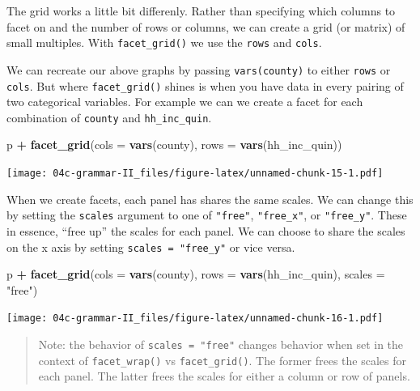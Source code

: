 \documentclass[
]{book}
\newenvironment{Shaded}{\begin{snugshade}}{\end{snugshade}}
\newcommand{\DataTypeTok}[1]{\textcolor[rgb]{0.13,0.29,0.53}{#1}}
\newcommand{\KeywordTok}[1]{\textcolor[rgb]{0.13,0.29,0.53}{\textbf{#1}}}
\newcommand{\NormalTok}[1]{#1}
\newcommand{\OperatorTok}[1]{\textcolor[rgb]{0.81,0.36,0.00}{\textbf{#1}}}
\newcommand{\StringTok}[1]{\textcolor[rgb]{0.31,0.60,0.02}{#1}}
\begin{document}
The grid works a little bit differenly. Rather than specifying which columns to facet on and the number of rows or columns, we can create a grid (or matrix) of small multiples. With \texttt{facet\_grid()} we use the \texttt{rows} and \texttt{cols}.

We can recreate our above graphs by passing \texttt{vars(county)} to either \texttt{rows} or \texttt{cols}. But where \texttt{facet\_grid()} shines is when you have data in every pairing of two categorical variables. For example we can we create a facet for each combination of \texttt{county} and \texttt{hh\_inc\_quin}.

\begin{Shaded}
\begin{Highlighting}[]
\NormalTok{p }\OperatorTok{+}
\StringTok{  }\KeywordTok{facet\_grid}\NormalTok{(}\DataTypeTok{cols =} \KeywordTok{vars}\NormalTok{(county),}
             \DataTypeTok{rows =} \KeywordTok{vars}\NormalTok{(hh\_inc\_quin))}
\end{Highlighting}
\end{Shaded}

\texttt{[image: 04c-grammar-II\_files/figure-latex/unnamed-chunk-15-1.pdf]}

When we create facets, each panel has shares the same scales. We can change this by setting the \texttt{scales} argument to one of \texttt{"free"}, \texttt{"free\_x"}, or \texttt{"free\_y"}. These in essence, ``free up'' the scales for each panel. We can choose to share the scales on the x axis by setting \texttt{scales\ =\ "free\_y"} or vice versa.

\begin{Shaded}
\begin{Highlighting}[]
\NormalTok{p }\OperatorTok{+}
\StringTok{  }\KeywordTok{facet\_grid}\NormalTok{(}\DataTypeTok{cols =} \KeywordTok{vars}\NormalTok{(county),}
             \DataTypeTok{rows =} \KeywordTok{vars}\NormalTok{(hh\_inc\_quin),}
             \DataTypeTok{scales =} \StringTok{"free"}\NormalTok{)}
\end{Highlighting}
\end{Shaded}

\texttt{[image: 04c-grammar-II\_files/figure-latex/unnamed-chunk-16-1.pdf]}

\begin{quote}
Note: the behavior of \texttt{scales\ =\ "free"} changes behavior when set in the context of \texttt{facet\_wrap()} vs \texttt{facet\_grid()}. The former frees the scales for each panel. The latter frees the scales for either a column or row of panels.
\end{quote}
\end{document}
